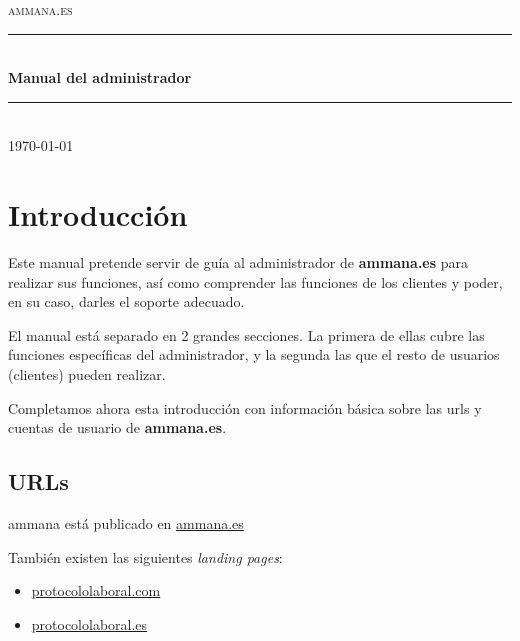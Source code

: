 \documentclass[12pt, spanish]{article}
\begin{document}

    \begin{titlepage}
        \newcommand { \HRule } { \rule {\linewidth} {0.5mm} }
        \center
        \textsc {\LARGE ammana.es} \\ [1.5cm]
        \HRule \\ [0.4cm]
        { \huge \bfseries Manual del administrador } \\ [0.4cm]
        \HRule \\ [1.5cm]
        { \large \today } \\ [3cm]
        \vfill
    \end{titlepage}


    \tableofcontents

    \newpage


    \section{Introducción}

        Este manual pretende servir de guía al administrador de \textbf{ammana.es} para 
    realizar sus funciones, así como comprender las funciones de los clientes y poder, en
    su caso, darles el soporte adecuado.

        El manual está separado en 2 grandes secciones. La primera de ellas cubre las funciones
    específicas del administrador, y la segunda las que el resto de usuarios (clientes) pueden
    realizar.

        Completamos ahora esta introducción con información básica sobre las urls y cuentas de
    usuario de \textbf{ammana.es}.


    \subsection{URLs}

        ammana está publicado en \url{ammana.es}

        También existen las siguientes {\em landing pages}:
        \begin{itemize}
            \item \url{protocololaboral.com}
            \item \url{protocololaboral.es}
        \end{itemize}
\end{document}
